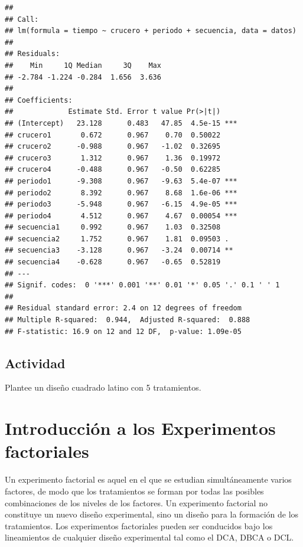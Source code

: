 \documentclass[]{book}
\begin{document}
\begin{verbatim}
## 
## Call:
## lm(formula = tiempo ~ crucero + periodo + secuencia, data = datos)
## 
## Residuals:
##    Min     1Q Median     3Q    Max 
## -2.784 -1.224 -0.284  1.656  3.636 
## 
## Coefficients:
##             Estimate Std. Error t value Pr(>|t|)    
## (Intercept)   23.128      0.483   47.85  4.5e-15 ***
## crucero1       0.672      0.967    0.70  0.50022    
## crucero2      -0.988      0.967   -1.02  0.32695    
## crucero3       1.312      0.967    1.36  0.19972    
## crucero4      -0.488      0.967   -0.50  0.62285    
## periodo1      -9.308      0.967   -9.63  5.4e-07 ***
## periodo2       8.392      0.967    8.68  1.6e-06 ***
## periodo3      -5.948      0.967   -6.15  4.9e-05 ***
## periodo4       4.512      0.967    4.67  0.00054 ***
## secuencia1     0.992      0.967    1.03  0.32508    
## secuencia2     1.752      0.967    1.81  0.09503 .  
## secuencia3    -3.128      0.967   -3.24  0.00714 ** 
## secuencia4    -0.628      0.967   -0.65  0.52819    
## ---
## Signif. codes:  0 '***' 0.001 '**' 0.01 '*' 0.05 '.' 0.1 ' ' 1
## 
## Residual standard error: 2.4 on 12 degrees of freedom
## Multiple R-squared:  0.944,  Adjusted R-squared:  0.888 
## F-statistic: 16.9 on 12 and 12 DF,  p-value: 1.09e-05
\end{verbatim}

\section{Actividad}\label{actividad-4}

Plantee un diseño cuadrado latino con 5 tratamientos.

\chapter{Introducción a los Experimentos
factoriales}\label{introduccion-a-los-experimentos-factoriales}

Un experimento factorial es aquel en el que se estudian simultáneamente
varios factores, de modo que los tratamientos se forman por todas las
posibles combinaciones de los niveles de los factores. Un experimento
factorial no constituye un nuevo diseño experimental, sino un diseño
para la formación de los tratamientos. Los experimentos factoriales
pueden ser conducidos bajo los lineamientos de cualquier diseño
experimental tal como el DCA, DBCA o DCL.
\end{document}
